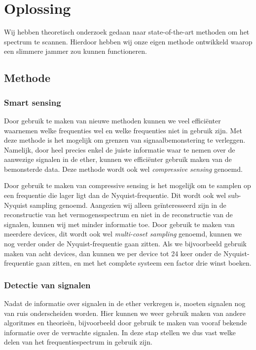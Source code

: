 \documentclass[oneside, a4paper, openany]{memoir}
\begin{document}
\chapter{Oplossing}
Wij hebben theoretisch onderzoek gedaan naar state-of-the-art methoden om het spectrum te scannen. Hierdoor hebben wij onze eigen methode ontwikkeld waarop een slimmere jammer zou kunnen functioneren.


\section{Methode}
\subsection{Smart sensing}
Door gebruik te maken van nieuwe methoden kunnen we veel efficiënter waarnemen welke frequenties wel en welke frequenties niet in gebruik zijn. Met deze methode is het mogelijk om grenzen van signaalbemonstering te verleggen. Namelijk, door heel precies enkel de juiste informatie waar te nemen over de aanwezige signalen in de ether, kunnen we efficiënter gebruik maken van de bemonsterde data. Deze methode wordt ook wel \textit{compressive sensing} genoemd.

\begin{blockDetail}
Door gebruik te maken van compressive sensing is het mogelijk om te samplen op een frequentie die lager ligt dan de Nyquist-frequentie. Dit wordt ook wel sub-Nyquist sampling genoemd. Aangezien wij alleen geïnteresseerd zijn in de reconstructie van het vermogensspectrum en niet in de reconstructie van de signalen, kunnen wij met minder informatie toe. Door gebruik te maken van meerdere devices, dit wordt ook wel \textit{multi-coset sampling} genoemd, kunnen we nog verder onder de Nyquist-frequentie gaan zitten. Als we bijvoorbeeld gebruik maken van acht devices, dan kunnen we per device tot 24 keer onder de Nyquist-frequentie gaan zitten, en met het complete systeem een factor drie winst boeken. \cite{ariananda2011multicoset}\cite{ariananda2012compressive}
\end{blockDetail}

\subsection{Detectie van signalen}
Nadat de informatie over signalen in de ether verkregen is, moeten signalen nog van ruis onderscheiden worden. Hier kunnen we weer gebruik maken van andere algoritmes en theorieën, bijvoorbeeld door gebruik te maken van vooraf bekende informatie over de verwachte signalen. In deze stap stellen we dus vast welke delen van het frequentiespectrum in gebruik zijn.
\end{document}

